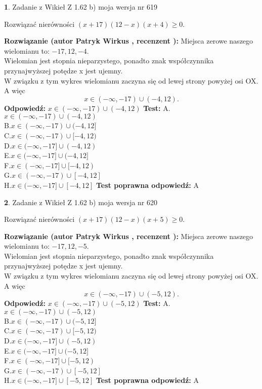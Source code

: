 \documentclass[12pt, a4paper]{article}
\theoremstyle{definition} %
\newtheorem{zad}{}
\newcommand{\zadStart}[1]{\begin{zad}#1\newline}
\newcommand{\zadStop}{\end{zad}}
\newcommand{\rozwStart}[2]{\noindent \textbf{Rozwiązanie (autor #1 , recenzent #2): }\newline}
\newcommand{\rozwStop}{\newline}
\newcommand{\odpStart}{\noindent \textbf{Odpowiedź:}\newline}
\newcommand{\odpStop}{\newline}
\newcommand{\testStart}{\noindent \textbf{Test:}\newline}
\newcommand{\testStop}{\newline}
\newcommand{\kluczStart}{\noindent \textbf{Test poprawna odpowiedź:}\newline}
\newcommand{\kluczStop}{\newline}
\begin{document}
\zadStart{Zadanie z Wikieł Z 1.62 b) moja wersja nr 619}

Rozwiązać nierówności $(x+17)(12-x)(x+4)\ge0$.
\zadStop
\rozwStart{Patryk Wirkus}{}
Miejsca zerowe naszego wielomianu to: $-17, 12, -4$.\\
Wielomian jest stopnia nieparzystego, ponadto znak współczynnika przy\linebreak najwyższej potędze x jest ujemny.\\ W związku z tym wykres wielomianu zaczyna się od lewej strony powyżej osi OX. A więc $$x \in (-\infty,-17) \cup (-4,12).$$
\rozwStop
\odpStart
$x \in (-\infty,-17) \cup (-4,12)$
\odpStop
\testStart
A.$x \in (-\infty,-17) \cup (-4,12)$\\
B.$x \in (-\infty,-17) \cup (-4,12]$\\
C.$x \in (-\infty,-17) \cup [-4,12)$\\
D.$x \in (-\infty,-17] \cup (-4,12)$\\
E.$x \in (-\infty,-17] \cup (-4,12]$\\
F.$x \in (-\infty,-17] \cup [-4,12)$\\
G.$x \in (-\infty,-17) \cup [-4,12]$\\
H.$x \in (-\infty,-17] \cup [-4,12]$
\testStop
\kluczStart
A
\kluczStop



\zadStart{Zadanie z Wikieł Z 1.62 b) moja wersja nr 620}

Rozwiązać nierówności $(x+17)(12-x)(x+5)\ge0$.
\zadStop
\rozwStart{Patryk Wirkus}{}
Miejsca zerowe naszego wielomianu to: $-17, 12, -5$.\\
Wielomian jest stopnia nieparzystego, ponadto znak współczynnika przy\linebreak najwyższej potędze x jest ujemny.\\ W związku z tym wykres wielomianu zaczyna się od lewej strony powyżej osi OX. A więc $$x \in (-\infty,-17) \cup (-5,12).$$
\rozwStop
\odpStart
$x \in (-\infty,-17) \cup (-5,12)$
\odpStop
\testStart
A.$x \in (-\infty,-17) \cup (-5,12)$\\
B.$x \in (-\infty,-17) \cup (-5,12]$\\
C.$x \in (-\infty,-17) \cup [-5,12)$\\
D.$x \in (-\infty,-17] \cup (-5,12)$\\
E.$x \in (-\infty,-17] \cup (-5,12]$\\
F.$x \in (-\infty,-17] \cup [-5,12)$\\
G.$x \in (-\infty,-17) \cup [-5,12]$\\
H.$x \in (-\infty,-17] \cup [-5,12]$
\testStop
\kluczStart
A
\kluczStop
\end{document}

